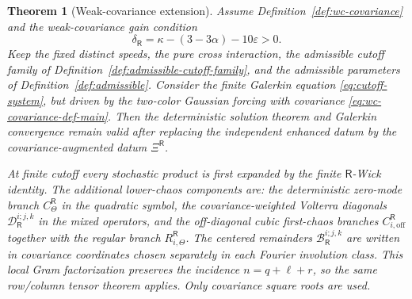 \documentclass[10pt]{amsart}
\numberwithin{equation}{section}
\theoremstyle{plain}
\newtheorem{theorem}{Theorem}[section]
\theoremstyle{definition}
\theoremstyle{remark}
\newcommand{\eps}{\varepsilon}
\begin{document}
\begin{theorem}[Weak-covariance extension]\label{thm:weak-covariance-main}
Assume Definition~\ref{def:wc-covariance} and the weak-covariance gain condition
\begin{equation}\label{eq:wc-main-threshold}
        \delta_{\mathsf R}=\kappa-(3-3\alpha)-10\eps>0.
\end{equation}
Keep the fixed distinct speeds, the pure cross interaction, the admissible cutoff family of Definition~\ref{def:admissible-cutoff-family}, and the admissible parameters of Definition~\ref{def:admissible}.  Consider the finite Galerkin equation \eqref{eq:cutoff-system}, but driven by the two-color Gaussian forcing with covariance \eqref{eq:wc-covariance-def-main}.  Then the deterministic solution theorem and Galerkin convergence remain valid after replacing the independent enhanced datum by the covariance-augmented datum \(\Xi^{\mathsf R}\).

At finite cutoff every stochastic product is first expanded by the finite \(\mathsf R\)-Wick identity.  The additional lower-chaos components are: the deterministic zero-mode branch \(C_\Theta^{\mathsf R}\) in the quadratic symbol, the covariance-weighted Volterra diagonals \(\mathcal D_{\mathsf R}^{i;j,k}\) in the mixed operators, and the off-diagonal cubic first-chaos branches \(C_{i,\mathrm{off}}^{\mathsf R}\) together with the regular branch \(R_{i,\Theta}^{\mathsf R}\).  The centered remainders \(\mathcal B_{\mathsf R}^{i;j,k}\) are written in covariance coordinates chosen separately in each Fourier involution class.  This local Gram factorization preserves the incidence \(n=q+\ell+r\), so the same row/column tensor theorem applies.  Only covariance square roots are used.


\end{theorem}
\end{document}
